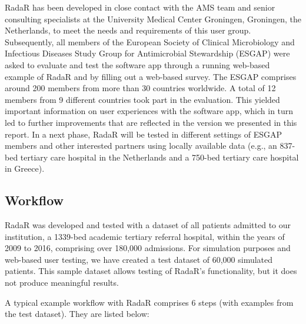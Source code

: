 \documentclass[
]{book}
\begin{document}
RadaR has been developed in close contact with the AMS team and senior consulting specialists at the University Medical Center Groningen, Groningen, the Netherlands, to meet the needs and requirements of this user group. Subsequently, all members of the European Society of Clinical Microbiology and Infectious Diseases Study Group for Antimicrobial Stewardship (ESGAP) were asked to evaluate and test the software app through a running web-based example of RadaR and by filling out a web-based survey. The ESGAP comprises around 200 members from more than 30 countries worldwide. A total of 12 members from 9 different countries took part in the evaluation. This yielded important information on user experiences with the software app, which in turn led to further improvements that are reflected in the version we presented in this report. In a next phase, RadaR will be tested in different settings of ESGAP members and other interested partners using locally available data (e.g., an 837-bed tertiary care hospital in the Netherlands and a 750-bed tertiary care hospital in Greece).

\hypertarget{workflow}{%
\subsection{Workflow}\label{workflow}}

RadaR was developed and tested with a dataset of all patients admitted to our institution, a 1339-bed academic tertiary referral hospital, within the years of 2009 to 2016, comprising over 180,000 admissions. For simulation purposes and web-based user testing, we have created a test dataset of 60,000 simulated patients. This sample dataset allows testing of RadaR's functionality, but it does not produce meaningful results.

A typical example workflow with RadaR comprises 6 steps (with examples from the test dataset). They are listed below:
\end{document}
